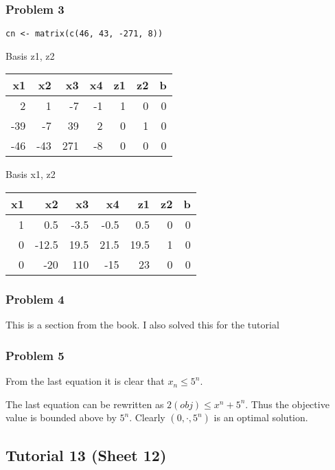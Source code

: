 \documentclass[11pt]{article}
\begin{document}
\subsubsection{Problem 3}
\label{sec:org1e9ce99}
\begin{verbatim}
cn <- matrix(c(46, 43, -271, 8))
\end{verbatim}

Basis z1, z2
\begin{center}
\begin{tabular}{rrrrrrr}
x1 & x2 & x3 & x4 & z1 & z2 & b\\
\hline
2 & 1 & -7 & -1 & 1 & 0 & 0\\
-39 & -7 & 39 & 2 & 0 & 1 & 0\\
\hline
-46 & -43 & 271 & -8 & 0 & 0 & 0\\
\end{tabular}
\end{center}

Basis x1, z2
\begin{center}
\begin{tabular}{rrrrrrr}
x1 & x2 & x3 & x4 & z1 & z2 & b\\
\hline
1 & 0.5 & -3.5 & -0.5 & 0.5 & 0 & 0\\
0 & -12.5 & 19.5 & 21.5 & 19.5 & 1 & 0\\
0 & -20 & 110 & -15 & 23 & 0 & 0\\
\end{tabular}
\end{center}



\subsubsection{Problem 4}
\label{sec:orge00e2bb}
This is a section from the book. I also solved this for the tutorial
\subsubsection{Problem 5}
\label{sec:org7e179d6}
From the last equation it is clear that \(x_n \le 5^n\). 

The last equation can be rewritten as \(2(obj) \le x^n + 5^n\). Thus the
objective value is bounded above by \(5^n\). Clearly \((0, \cdot, 5^n)\) is an
optimal solution.
\subsection{Tutorial 13 (Sheet 12)}
\label{sec:orgbdc60c0}
\end{document}
